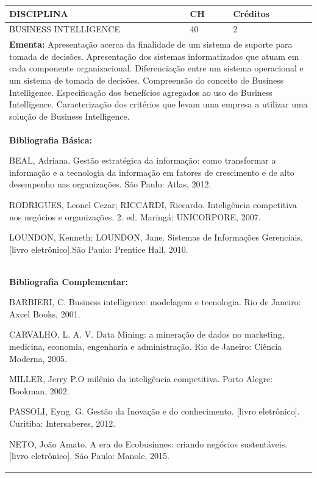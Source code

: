 \documentclass[a4paper, 12pt, openright, oneside, german, french, english, brazil]{abntex2}
\begin{document}
\begin{table}[!h]
  \footnotesize
  \centering
  \begin{tabular}{|p{100mm}|p{10mm}|p{20mm}|}
    \hline
    \textbf{DISCIPLINA} & \textbf{CH} & \textbf{Créditos} \\
    \hline
    BUSINESS INTELLIGENCE & 40 & 2 \\
    \hline
    \multicolumn{3}{|p{130mm}|}{\textbf{Ementa:}  Apresentação acerca da finalidade de um sistema de suporte para tomada de decisões. Apresentação dos sistemas informatizados que atuam em cada componente organizacional. Diferenciação entre um sistema operacional e um sistema de tomada de decisões. Compreensão do conceito de Business Intelligence. Especificação dos benefícios agregados ao uso do Business Intelligence. Caracterização dos critérios que levam uma empresa a utilizar uma solução de Business Intelligence.} \\
    \hline
    \multicolumn{3}{|p{130mm}|}{\textbf{Bibliografia Básica:}

    BEAL, Adriana. Gestão estratégica da informação: como transformar a informação e a tecnologia da informação em fatores de crescimento e de alto desempenho nas organizações. São Paulo: Atlas, 2012.

RODRIGUES, Leonel Cezar; RICCARDI, Riccardo. Inteligência competitiva nos negócios e organizações. 2. ed. Maringá: UNICORPORE, 2007.

LOUNDON, Kenneth; LOUNDON, Jane. Sistemas de Informações Gerenciais.[livro eletrônico].São Paulo: Prentice Hall, 2010.
} \\
    \hline
    \multicolumn{3}{|p{130mm}|}{\textbf{Bibliografia Complementar:}

    BARBIERI, C. Business intelligence: modelagem e tecnologia. Rio de Janeiro: Axcel Books, 2001.

CARVALHO, L. A. V. Data Mining: a mineração de dados no marketing, medicina, economia, engenharia e administração. Rio de Janeiro: Ciência Moderna, 2005.

MILLER, Jerry P.O milênio da inteligência competitiva. Porto Alegre: Bookman, 2002.

PASSOLI, Eyng. G. Gestão da Inovação e do conhecimento. [livro eletrônico]. Curitiba: Intersaberes, 2012.

NETO, João Amato. A era do Ecobusinnes: criando negócios sustentáveis. [livro eletrônico]. São Paulo: Manole, 2015.
} \\
    \hline
  \end{tabular}
\end{table}
\end{document}
